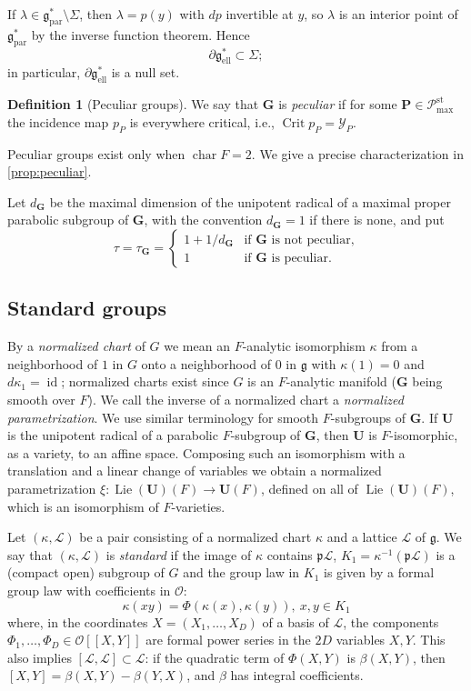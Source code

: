 \documentclass[11pt,reqno]{amsart}
\numberwithin{equation}{section}
\theoremstyle{plain}
\theoremstyle{definition}
\newtheorem{definition}[theorem]{Definition}
\theoremstyle{remark}
\theoremstyle{plain}
\newcommand{\OO}{\mathcal{O}}    %
\newcommand{\pp}{\mathfrak{p}}   %
\newcommand{\Lat}{\mathcal{L}}   %
\newcommand{\bG}{\mathbf{G}}     %
\newcommand{\bP}{\mathbf{P}}     %
\newcommand{\bU}{\mathbf{U}}     %
\newcommand{\g}{\mathfrak{g}}    %
\newcommand{\gd}{\mathfrak{g}^*} %
\newcommand{\Ell}[2][]{#2_{#1\mathrm{ell}}}   %
\newcommand{\Par}[2][]{#2_{#1\mathrm{par}}}
\newcommand{\Pc}{\mathscr{P}^{\mathrm{st}}_{\mathrm{max}}}    %
\DeclareMathOperator{\Lie}{Lie}
\DeclareMathOperator{\Crit}{Crit}
\DeclareMathOperator{\id}{id}
\DeclareMathOperator{\chr}{char}   %
\newcommand{\peculiar}{peculiar}
\newcommand{\Peculiar}{Peculiar}
\newcommand{\eexp}{\tau}
\newcommand{\dG}{d_{\bG}}
\newcommand{\lf}{\lambda}
\newcommand{\nchart}{normalized chart}
\newcommand{\npar}{normalized parametrization}  %
\newcommand{\Inc}{\mathcal{Y}}
\newcommand{\Crv}{\Sigma}
\begin{document}
If $\lf\in\Par{\gd}\setminus\Crv$, then $\lf=p(y)$ with $dp$ invertible at $y$,
so $\lf$ is an interior point of $\Par{\gd}$ by the inverse function theorem. Hence
\begin{equation}\label{eq:boundary}
\partial\Ell{\gd}\subset\Crv;
\end{equation}
in particular, $\partial\Ell{\gd}$ is a null set.



\begin{definition}[Peculiar groups]\label{def:peculiar}
We say that $\bG$ is \emph{\peculiar{}} if for some $\bP\in\Pc$ the incidence
map $p_P$ is everywhere critical, i.e., $\Crit p_P=\Inc_P$.
\end{definition}

\Peculiar{} groups exist only when $\chr F=2$.
We give a precise characterization in \cref{prop:peculiar}.

Let $\dG{}$ be the maximal dimension of the unipotent radical of a
maximal proper parabolic subgroup of $\bG$, with the convention
$\dG{}=1$ if there is none, and put
\begin{equation}\label{eq:tau}
\eexp=\eexp_{\bG}=
\begin{cases}
1+1/\dG{}&\text{if $\bG$ is not \peculiar{},}\\
1&\text{if $\bG$ is \peculiar{}.}
\end{cases}
\end{equation}



\subsection{Standard groups}\label{sec:standardgroups}
By a \emph{\nchart{}} of $G$ we mean an $F$-analytic isomorphism $\kappa$ from a
neighborhood of $1$ in $G$ onto a neighborhood of $0$ in $\g$ with
$\kappa(1)=0$ and $d\kappa_1=\id$; \nchart{}s exist since $G$ is an
$F$-analytic manifold ($\bG$ being smooth over $F$).
We call the inverse of a \nchart{} a \emph{\npar{}}.
We use similar terminology for smooth $F$-subgroups of $\bG$.
If $\bU$ is the unipotent radical of a parabolic $F$-subgroup of $\bG$, then $\bU$ is $F$-isomorphic, as a variety, to an affine space.
Composing such an isomorphism with a translation and a linear change of variables we
obtain a \npar{} $\xi:\Lie(\bU)(F)\to\bU(F)$, defined on all of $\Lie(\bU)(F)$, which is
an isomorphism of $F$-varieties.

Let $(\kappa,\Lat)$ be a pair consisting of a \nchart{} $\kappa$ and a lattice $\Lat$ of $\g$.
We say that $(\kappa,\Lat)$ is \emph{standard} if the image of $\kappa$ contains $\pp\Lat$,
$K_1=\kappa^{-1}(\pp\Lat)$ is a (compact open) subgroup of $G$ and the group law in $K_1$ is given by a formal group law with coefficients in $\OO$:
\[
\kappa(xy)=\Phi(\kappa(x),\kappa(y)),\ x,y\in K_1
\]
where, in the coordinates $X=(X_1,\dots,X_D)$ of a basis of $\Lat$,
the components $\Phi_1,\dots,\Phi_D\in\OO[[X,Y]]$ are formal power series
in the $2D$ variables $X,Y$. This also implies $[\Lat,\Lat]\subset\Lat$:
if the quadratic term of $\Phi(X,Y)$ is $\beta(X,Y)$, then
$[X,Y]=\beta(X,Y)-\beta(Y,X)$, and $\beta$ has integral coefficients.
\end{document}
